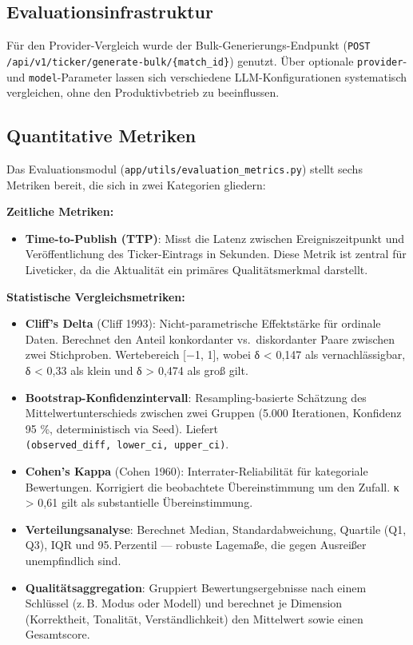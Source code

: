 \subsection{Evaluationsinfrastruktur}\label{evaluationsinfrastruktur}

Für den Provider-Vergleich wurde der Bulk-Generierungs-Endpunkt (\texttt{POST /api/v1/ticker/generate-bulk/\{match\_id\}}) genutzt. Über optionale \texttt{provider}- und \texttt{model}-Parameter lassen sich verschiedene LLM-Konfigurationen systematisch vergleichen, ohne den Produktivbetrieb zu beeinflussen.

\subsection{Quantitative Metriken}\label{quantitative-metriken}

Das Evaluationsmodul (\texttt{app/utils/evaluation\_metrics.py}) stellt
sechs Metriken bereit, die sich in zwei Kategorien gliedern:

\textbf{Zeitliche Metriken:}

\begin{itemize}
\tightlist
\item
  \textbf{Time-to-Publish (TTP)}: Misst die Latenz zwischen
  Ereigniszeitpunkt und Veröffentlichung des Ticker-Eintrags in
  Sekunden. Diese Metrik ist zentral für Liveticker, da die Aktualität
  ein primäres Qualitätsmerkmal darstellt.
\end{itemize}

\textbf{Statistische Vergleichsmetriken:}

\begin{itemize}
\tightlist
\item
  \textbf{Cliff's Delta} (Cliff 1993): Nicht-parametrische Effektstärke
  für ordinale Daten. Berechnet den Anteil konkordanter vs.~diskordanter
  Paare zwischen zwei Stichproben. Wertebereich {[}−1, 1{]}, wobei
  \textbar δ\textbar{} \textless{} 0,147 als vernachlässigbar,
  \textbar δ\textbar{} \textless{} 0,33 als klein und
  \textbar δ\textbar{} \textgreater{} 0,474 als groß gilt.
\item
  \textbf{Bootstrap-Konfidenzintervall}: Resampling-basierte Schätzung
  des Mittelwertunterschieds zwischen zwei Gruppen (5.000 Iterationen,
  Konfidenz 95 \%, deterministisch via Seed). Liefert
  \texttt{(observed\_diff,\ lower\_ci,\ upper\_ci)}.
\item
  \textbf{Cohen's Kappa} (Cohen 1960): Interrater-Reliabilität für
  kategoriale Bewertungen. Korrigiert die beobachtete Übereinstimmung um
  den Zufall. κ \textgreater{} 0,61 gilt als substantielle
  Übereinstimmung.
\item
  \textbf{Verteilungsanalyse}: Berechnet Median, Standardabweichung, Quartile (Q1, Q3), IQR und 95.\,Perzentil --- robuste Lagemaße, die gegen Ausreißer unempfindlich sind.
\item
  \textbf{Qualitätsaggregation}: Gruppiert Bewertungsergebnisse nach einem Schlüssel (z.\,B. Modus oder Modell) und berechnet je Dimension (Korrektheit, Tonalität, Verständlichkeit) den Mittelwert sowie einen Gesamtscore.
\end{itemize}


